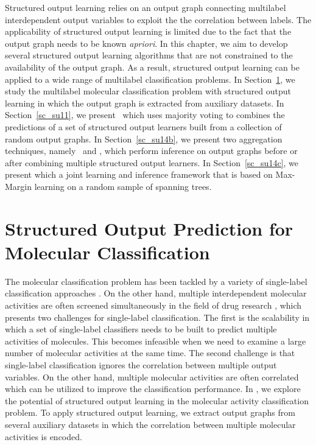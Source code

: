 {Structured output learning relies on an output graph connecting multilabel interdependent output variables to exploit the the correlation between labels.
The applicability of structured output learning is limited due to the fact that the output graph needs to be known \textit{apriori}.
In this chapter, we aim to develop several structured output learning algorithms that are not constrained to the availability of the output graph.
As a result, structured output learning can be applied to a wide range of multilabel classification problems.
In Section~\ref{sc_su10}, we study the multilabel molecular classification problem with structured output learning in which the output graph is extracted from auxiliary datasets.
In Section~\ref{sc_su11}, we present \mve\ which uses majority voting to combines the predictions of a set of structured output learners built from a collection of random output graphs.
In Section~\ref{sc_su14b}, we present two aggregation techniques, namely \amm\ and \mam, which perform inference on output graphs before or after combining multiple structured output learners.
In Section~\ref{sc_su14c}, we present \rta which a joint learning and inference framework that
is based on Max-Margin learning on a random sample of spanning trees.



%
%
\section{Structured Output Prediction for Molecular Classification} \label{sc_su10}

The molecular classification problem has been tackled by a variety of single-label classification approaches \citep{Menchetti05weighted,Singh12qsar,Dutt12classification}.
On the other hand, multiple interdependent molecular activities are often screened simultaneously in the field of drug research \citep{Shoemaker06the}, which presents two challenges for single-label classification.
The first is the scalability in which a set of single-label classifiers needs to be built to predict multiple activities of molecules.
This becomes infeasible when we need to examine a large number of molecular activities at the same time.
The second challenge is that single-label classification ignores the correlation between multiple output variables.
On the other hand, multiple molecular activities are often correlated which can be utilized to improve the classification performance.
In , we explore the potential of structured output learning in the molecular activity classification problem.
To apply structured output learning, we extract output graphs from several auxiliary datasets in which the correlation between multiple molecular activities is encoded.


}
